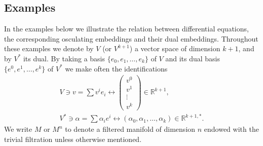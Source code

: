\documentclass[10pt,a4paper]{amsart}
\newcommand{\R}{\mathbb R}
\numberwithin{equation}{section}
\begin{document}
\subsection{Examples}
In the examples below we illustrate the relation between differential equations, the corresponding osculating embeddings and their dual embeddings. Throughout these examples we denote by $V$ (or $V^{k+1}$) a vector space of dimension $k+1$, and by $V^*$ its dual. By taking a basis $\{e_0,e_1,\dots,e_k\}$ of $V$ and its dual basis $\{e^0,e^1,\dots,e^k\}$ of $V^*$ we make often the identifications
\begin{gather*}
V\ni v =\sum v^i e_i \leftrightarrow \begin{pmatrix} v^0 \\ v^1 \\ \vdots \\v^k \end{pmatrix} \in \R^{k+1},
\\
V^*\ni\alpha = \sum\alpha_i e^i \leftrightarrow (\alpha_0,\alpha_1,\dots,\alpha_k)\in \R^{k+1,*}.
\end{gather*}
We write $M$ or $M^n$ to denote a filtered manifold of dimension $n$ endowed with the trivial filtration unless otherwise mentioned.
\end{document}
